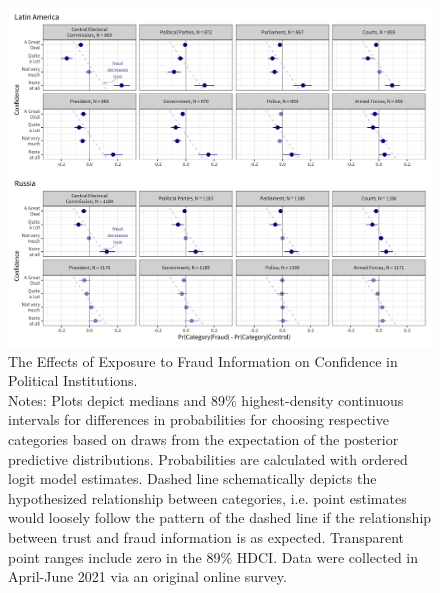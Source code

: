 \documentclass[11pt, ngerman,english,a4]{article}
\begin{document}
\begin{figure}[H]
    \centering
    \includegraphics[width=\linewidth,trim=4 4 4 4,clip]{figs/main_hdi89_1.png}
    \caption{The Effects of Exposure to Fraud Information on Confidence in Political Institutions.  \\
     \footnotesize{Notes: Plots depict medians and 89\% highest-density continuous intervals for differences in probabilities for choosing respective categories based on draws from the expectation of the posterior predictive distributions. Probabilities are calculated with ordered logit model estimates.
     Dashed line schematically depicts the hypothesized relationship between categories, i.e. point estimates would loosely follow the pattern of the dashed line if the relationship between trust and fraud information is as expected. Transparent point ranges include zero in the 89\% HDCI.
     Data were collected in April-June 2021 via an original online survey. } }
    \singlespacing
    \raggedright
    
    \label{fig:main}
    \end{figure}
\end{document}
